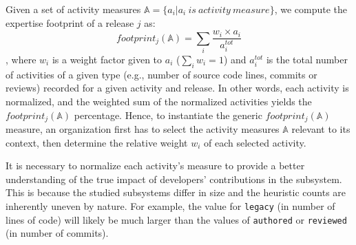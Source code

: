 Given a set of activity measures $\mathbb{A}=\{a_i | a_i\ is\ activity\ measure\}$, we compute the expertise footprint of a release $j$ as: $$footprint_j(\mathbb{A})=\sum_{i} \frac{w_i \times a_i}{a_i^{tot}}$$, where $w_i$ is a weight factor given to $a_i$ ($\sum_i w_i = 1$) and $a_i^{tot}$ is the total number of activities of a given type (e.g., number of source code lines, commits or reviews) recorded for a given activity and release. In other words, each activity is normalized, and the weighted sum of the normalized activities yields the $footprint_j(\mathbb{A})$ percentage. Hence, to instantiate the generic $footprint_j(\mathbb{A})$ measure, an organization first has to select the activity measures $\mathbb{A}$ relevant to its context, then determine the relative weight $w_i$ of each selected activity.





It is necessary to normalize each activity's measure %
to provide a better understanding of the true impact of developers' contributions in the subsystem. This is because the studied subsystems differ in size and the heuristic counts are inherently uneven by nature. For example, the value for \texttt{legacy} (in number of lines of code) will likely be much larger than the values of \texttt{authored} or \texttt{reviewed} (in number of commits). %





